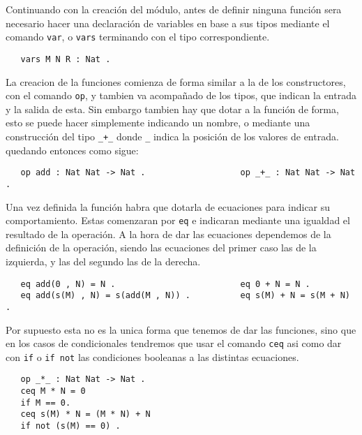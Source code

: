 Continuando con la creación del módulo, antes de definir ninguna función sera necesario hacer una declaración de variables en base a sus tipos mediante el comando \texttt{var}, o \texttt{vars} terminando con el tipo correspondiente. \par

{\codesize
\begin{verbatim}
   vars M N R : Nat .
\end{verbatim}
}

La creacion de la funciones comienza de forma similar a la de los constructores, con el comando \texttt{op}, y tambien va acompañado de los tipos, que indican la entrada y la salida de esta. Sin embargo tambien hay que dotar a la función de forma, esto se puede hacer simplemente indicando un nombre, o mediante una construcción del tipo \verb"_+_" donde \verb"_" indica la posición de los valores de entrada. quedando entonces como sigue: \par

{\codesize
\begin{verbatim}
   op add : Nat Nat -> Nat .                   op _+_ : Nat Nat -> Nat .
\end{verbatim}
}

Una vez definida la función habra que dotarla de ecuaciones para indicar su comportamiento. Estas comenzaran por \texttt{eq} e indicaran mediante una igualdad el resultado de la operación. A la hora de dar las ecuaciones dependemos de la definición de la operación, siendo las ecuaciones del primer caso las de la izquierda, y las del segundo las de la derecha. \par
{\codesize
\begin{verbatim}
   eq add(0 , N) = N .                         eq 0 + N = N .
   eq add(s(M) , N) = s(add(M , N)) .          eq s(M) + N = s(M + N) .
\end{verbatim}
}

Por supuesto esta no es la unica forma que tenemos de dar las funciones, sino que en los casos de condicionales tendremos que usar el comando \texttt{ceq} asi como dar con \texttt{if} o \texttt{if not} las condiciones booleanas a las distintas ecuaciones. \par

{\codesize
\begin{verbatim}
   op _*_ : Nat Nat -> Nat .
   ceq M * N = 0 
   if M == 0.
   ceq s(M) * N = (M * N) + N
   if not (s(M) == 0) .
\end{verbatim}
}

